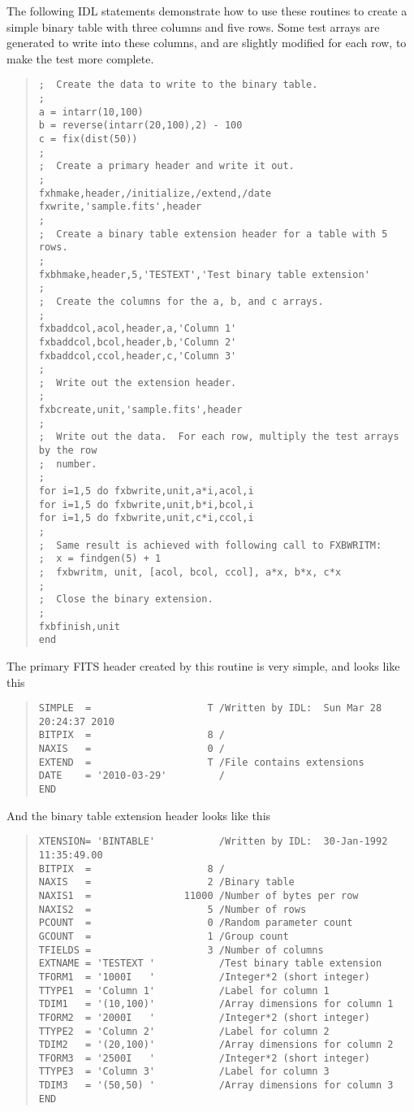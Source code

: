 The following IDL statements demonstrate how to use these routines to create a
simple binary table with three columns and five rows.  Some test arrays are
generated to write into these columns, and are slightly modified for each row,
to make the test more complete.
%
\begin{quote}
\begin{verbatim}
;  Create the data to write to the binary table.
;
a = intarr(10,100)
b = reverse(intarr(20,100),2) - 100
c = fix(dist(50))
;
;  Create a primary header and write it out.
;
fxhmake,header,/initialize,/extend,/date
fxwrite,'sample.fits',header
;
;  Create a binary table extension header for a table with 5 rows.
;
fxbhmake,header,5,'TESTEXT','Test binary table extension'
;
;  Create the columns for the a, b, and c arrays.
;
fxbaddcol,acol,header,a,'Column 1'
fxbaddcol,bcol,header,b,'Column 2'
fxbaddcol,ccol,header,c,'Column 3'
;
;  Write out the extension header.
;
fxbcreate,unit,'sample.fits',header
;
;  Write out the data.  For each row, multiply the test arrays by the row
;  number.
;
for i=1,5 do fxbwrite,unit,a*i,acol,i
for i=1,5 do fxbwrite,unit,b*i,bcol,i
for i=1,5 do fxbwrite,unit,c*i,ccol,i
;
;  Same result is achieved with following call to FXBWRITM:
;  x = findgen(5) + 1
;  fxbwritm, unit, [acol, bcol, ccol], a*x, b*x, c*x
;
;  Close the binary extension.
;
fxbfinish,unit
end
\end{verbatim}
\end{quote}
%
The primary FITS header created by this routine is very simple, and looks like
this
%
\begin{quote}
\begin{verbatim}
SIMPLE  =                    T /Written by IDL:  Sun Mar 28 20:24:37 2010
BITPIX  =                    8 /
NAXIS   =                    0 /
EXTEND  =                    T /File contains extensions
DATE    = '2010-03-29'         /
END
\end{verbatim}
\end{quote}
%
And the binary table extension header looks like this
%
\begin{quote}
\begin{verbatim}
XTENSION= 'BINTABLE'           /Written by IDL:  30-Jan-1992 11:35:49.00
BITPIX  =                    8 /
NAXIS   =                    2 /Binary table
NAXIS1  =                11000 /Number of bytes per row
NAXIS2  =                    5 /Number of rows
PCOUNT  =                    0 /Random parameter count
GCOUNT  =                    1 /Group count
TFIELDS =                    3 /Number of columns
EXTNAME = 'TESTEXT '           /Test binary table extension
TFORM1  = '1000I   '           /Integer*2 (short integer)
TTYPE1  = 'Column 1'           /Label for column 1
TDIM1   = '(10,100)'           /Array dimensions for column 1
TFORM2  = '2000I   '           /Integer*2 (short integer)
TTYPE2  = 'Column 2'           /Label for column 2
TDIM2   = '(20,100)'           /Array dimensions for column 2
TFORM3  = '2500I   '           /Integer*2 (short integer)
TTYPE3  = 'Column 3'           /Label for column 3
TDIM3   = '(50,50) '           /Array dimensions for column 3
END
\end{verbatim}
\end{quote}

